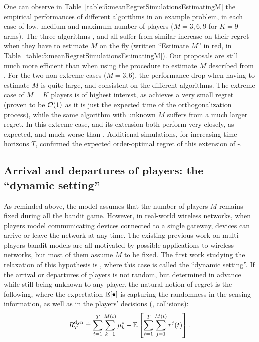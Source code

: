 One can observe in Table~\ref{table:5:meanRegretSimulationsEstimatingM} the empirical performances of different algorithms in an example problem, in each case of low, medium and maximum number of players ($M=3,6,9$ for $K=9$ arms).
The three algorithms \RhoRand, \RandTopM{} and \MCTopM{} all suffer from similar increase on their regret when they have to estimate $M$ on the fly (written ``Estimate $M$'' in red, in Table~\ref{table:5:meanRegretSimulationsEstimatingM}).
Our proposals are still much more efficient than \RhoRand{} when using the procedure to estimate $M$ described from \cite{Anandkumar11}.
For the two non-extreme cases ($M=3,6$), the performance drop when having to estimate $M$ is quite large,
and consistent on the different algorithms.
The extreme case of $M=K$ players is of highest interest, as \MCTopM{} achieves a very small regret (proven to be $\mathcal{O}(1)$ as it is just the expected time of the orthogonalization process), while the same algorithm with unknown $M$ suffers from a much larger regret.
In this extreme case, \RhoRand{} and its extension both perform very closely, as expected, and much worse than \MCTopM.
%
Additional simulations, for increasing time horizons $T$, confirmed the expected order-optimal regret of this extension of \MCTopM-\klUCB.


\subsection{Arrival and departures of players: the ``dynamic setting''}
\label{sub:5:arrivalDepartures}

As reminded above, the model assumes that the number of players $M$ remains fixed during all the bandit game.
However, in real-world wireless networks, when players model communicating devices connected to a single gateway, devices can arrive or leave the network at any time.
The existing previous work on multi-players bandit models are all motivated by possible applications to wireless networks, but most of them assume $M$ to be fixed.
The first work studying the relaxation of this hypothesis is \cite{Rosenski16}, where this case is called the ``dynamic setting''.
If the arrival or departures of players is not random, but determined in advance while still being unknown to any player, the natural notion of regret is the following, where the expectation $\mathbb{E}[\bullet]$ is capturing the randomness in the sensing information, as well as in the players' decisions (\ie, collisions):
\begin{equation}\label{eq:5:defRegretDynamicSetting}
    R_T^{\text{dyn}} \overset{.}{=} \sum_{t=1}^T \sum_{k=1}^{M(t)} \mu^*_{k} - \mathbb{E}\left[ \sum_{t=1}^T \sum_{j=1}^{M(t)} r^j(t) \right].
\end{equation}

